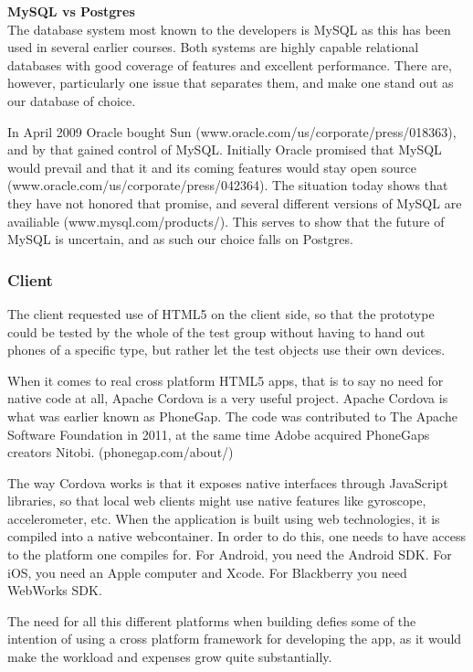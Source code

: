 \documentclass[11pt]{book}
\begin{document}
\textbf{MySQL vs Postgres}\\
The database system most known to the developers is MySQL as this has been used in several earlier courses. Both systems are highly capable relational databases with good coverage of features and excellent performance. There are, however, particularly one issue that separates them, and make one stand out as our database of choice.

In April 2009 Oracle bought Sun (www.oracle.com/us/corporate/press/018363), and by that gained control of MySQL. Initially Oracle promised that MySQL would prevail and that it and its coming features would stay open source (www.oracle.com/us/corporate/press/042364). The situation today shows that they have not honored that promise, and several different versions of MySQL are availiable (www.mysql.com/products/). This serves to show that the future of MySQL is uncertain, and as such our choice falls on Postgres.

\subsubsection{Client}
The client requested use of HTML5 on the client side, so that the prototype could be tested by the whole of the test group without having to hand out phones of a specific type, but rather let the test objects use their own devices.

When it comes to real cross platform HTML5 apps, that is to say no need for native code at all, Apache Cordova is a very useful project. Apache Cordova is what was earlier known as PhoneGap. The code was contributed to The Apache Software Foundation in 2011, at the same time Adobe acquired PhoneGaps creators Nitobi. (phonegap.com/about/)

The way Cordova works is that it exposes native interfaces through JavaScript libraries, so that local web clients might use native features like gyroscope, accelerometer, etc. When the application is built using web technologies, it is compiled into a native webcontainer. In order to do this, one needs to have access to the platform one compiles for. For Android, you need the Android SDK. For iOS, you need an Apple computer and Xcode. For Blackberry you need WebWorks SDK.

The need for all this different platforms when building defies some of the intention of using a cross platform framework for developing the app, as it would make the workload and expenses grow quite substantially.
\end{document}
